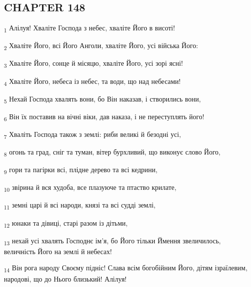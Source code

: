 \subsection{CHAPTER 148}
\begin{tcolorbox}
\textsubscript{1} Алілуя! Хваліте Господа з небес, хваліте Його в висоті!
\end{tcolorbox}
\begin{tcolorbox}
\textsubscript{2} Хваліте Його, всі Його Анголи, хваліте Його, усі війська Його:
\end{tcolorbox}
\begin{tcolorbox}
\textsubscript{3} Хваліте Його, сонце й місяцю, хваліте Його, усі зорі ясні!
\end{tcolorbox}
\begin{tcolorbox}
\textsubscript{4} Хваліте Його, небеса із небес, та води, що над небесами!
\end{tcolorbox}
\begin{tcolorbox}
\textsubscript{5} Нехай Господа хвалять вони, бо Він наказав, і створились вони,
\end{tcolorbox}
\begin{tcolorbox}
\textsubscript{6} Він їх поставив на вічні віки, дав наказа, і не переступлять його!
\end{tcolorbox}
\begin{tcolorbox}
\textsubscript{7} Хваліть Господа також з землі: риби великі й безодні усі,
\end{tcolorbox}
\begin{tcolorbox}
\textsubscript{8} огонь та град, сніг та туман, вітер бурхливий, що виконує слово Його,
\end{tcolorbox}
\begin{tcolorbox}
\textsubscript{9} гори та пагірки всі, плідне дерево та всі кедрини,
\end{tcolorbox}
\begin{tcolorbox}
\textsubscript{10} звірина й вся худоба, все плазуюче та птаство крилате,
\end{tcolorbox}
\begin{tcolorbox}
\textsubscript{11} земні царі й всі народи, князі та всі судді землі,
\end{tcolorbox}
\begin{tcolorbox}
\textsubscript{12} юнаки та дівиці, старі разом із дітьми,
\end{tcolorbox}
\begin{tcolorbox}
\textsubscript{13} нехай усі хвалять Господнє ім'я, бо Його тільки Ймення звеличилось, величність Його на землі й небесах!
\end{tcolorbox}
\begin{tcolorbox}
\textsubscript{14} Він рога народу Своєму підніс! Слава всім богобійним Його, дітям ізраїлевим, народові, що до Нього близький! Алілуя!
\end{tcolorbox}
